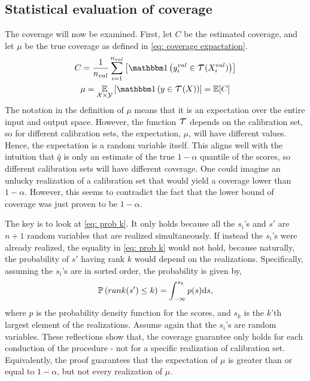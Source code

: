 \subsection{Statistical evaluation of coverage}
The coverage will now be examined. First, let $C$ be the estimated coverage, and let $\mu$ be the true coverage as defined in \cref{eq: coverage expactation}.
%
\begin{gather}
\label{eq: coverage mu}
C = \frac{1}{n_{val}}\sum_{i=1}^{n_{val}}\left[\doubleOne\left(y^{val}_i\in\Tau(X^{val}_i)\right)\right]\\
\label{eq: coverage C}
\mu = \doubleE_{\X \times\Y}\left[\doubleOne\left(y\in\Tau(X)\right)\right]=\doubleE[C]
\end{gather}
%
The notation in the definition of $\mu$ means that it is an expectation over the entire input and output space. However, the function $\Tau$ depends on the calibration set, so for different calibration sets, the expectation, $\mu$, will have different values. Hence, the expectation is a random variable itself. This aligns well with the intuition that $\hat q$ is only an estimate of the true $1-\alpha$ quantile of the scores, so different calibration sets will have different coverage. One could imagine an unlucky realization of a calibration set that would yield a coverage lower than $1-\alpha$. However, this seems to contradict the fact that the lower bound of coverage was just proven to be $1-\alpha$.

The key is to look at \cref{eq: prob k}. It only holds because all the $s_i$'s and $s'$ are $n+1$ random variables that are realized simultaneously. If instead the $s_i$'s were already realized, the equality in \cref{eq: prob k} would not hold, because naturally, the probability of $s'$ having rank $k$ would depend on the realizations. Specifically, assuming the $s_i$'s are in sorted order, the probability is given by,
\begin{gather}
    \operatorname*{\mathbb{P}}\left(rank(s')\leq k\right) = \int_{-\infty}^{s_{k}} p(s) \text{d} s ,
\end{gather}
where $p$ is the probability density function for the scores, and $s_k$ is the $k$'th largest element of the realizations. Assume again that the $s_i$'s are random variables. These reflections show that, the coverage guarantee only holds for each conduction of the procedure - not for a specific realization of calibration set. Equivalently, the proof guarantees that the expectation of $\mu$ is greater than or equal to $1-\alpha$, but not every realization of $\mu$.


